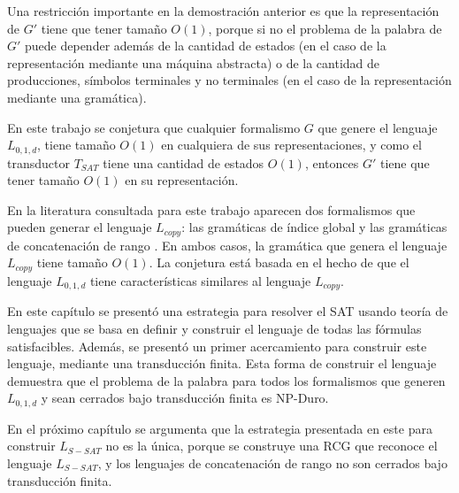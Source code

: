 Una restricción importante en la demostración anterior es que la representación de $G'$ tiene que tener tamaño $O(1)$, porque si no el problema de la palabra de $G'$ puede depender además de la cantidad de estados (en el caso de la representación mediante una máquina abstracta) o de la cantidad de producciones, símbolos terminales y no terminales (en el caso de la representación mediante una gramática).

En este trabajo se conjetura que cualquier formalismo $G$ que genere el lenguaje $L_{0,1,d}$, tiene tamaño $O(1)$ en cualquiera de sus representaciones, y como el transductor $T_{SAT}$ tiene una cantidad de estados $O(1)$, entonces $G'$ tiene que tener tamaño $O(1)$ en su representación.

En la literatura consultada para este trabajo aparecen dos formalismos que pueden generar el lenguaje $L_{copy}$: las gramáticas de índice global \cite{globalIndexLanguages} y las gramáticas de concatenación de rango \cite{propertiesRCGBib}. En ambos casos, la gramática que genera el lenguaje $L_{copy}$ tiene tamaño $O(1)$. La conjetura está basada en el hecho de que el lenguaje $L_{0,1,d}$ tiene características similares al lenguaje $L_{copy}$.

En este capítulo se presentó una estrategia para resolver el SAT usando teoría de lenguajes que se basa en definir y construir el lenguaje de todas las fórmulas satisfacibles. Además, se presentó un primer acercamiento para construir este lenguaje, mediante una transducción finita. Esta forma de construir el lenguaje demuestra que el problema de la palabra para todos los formalismos que generen $L_{0,1,d}$ y sean cerrados bajo transducción finita es NP-Duro.

En el próximo capítulo se argumenta que la estrategia presentada en este para construir $L_{S-SAT}$ no es la única, porque se construye una RCG que reconoce el lenguaje $L_{S-SAT}$, y los lenguajes de concatenación de rango no son cerrados bajo transducción finita.

